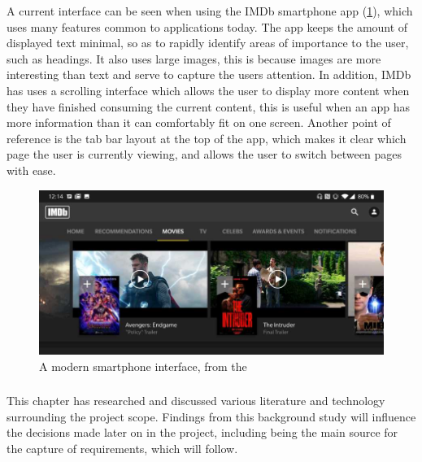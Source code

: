 A current interface can be seen when using the IMDb smartphone app (\cref{fig:imdb}), which uses many features common to applications today. The app keeps the amount of displayed text minimal, so as to rapidly identify areas of importance to the user, such as headings. It also uses large images, this is because images are more interesting than text and serve to capture the users attention. In addition, IMDb has uses a scrolling interface which allows the user to display more content when they have finished consuming the current content, this is useful when an app has more information than it can comfortably fit on one screen. Another point of reference is the tab bar layout at the top of the app, which makes it clear which page the user is currently viewing, and allows the user to switch between pages with ease.

\begin{figure}[ht]
\begin{minipage}{\textwidth}
    \centering
    \includegraphics[width=\textwidth]{images/litreview/imdb-screenshot}
    \caption{A modern smartphone interface, from the \protect{}}
    \label{fig:imdb}
\end{minipage}
\end{figure}


\subsubsection{}

This chapter has researched and discussed various literature and technology surrounding the project scope. Findings from this background study will influence the decisions made later on in the project, including being the main source for the capture of requirements, which will follow.

